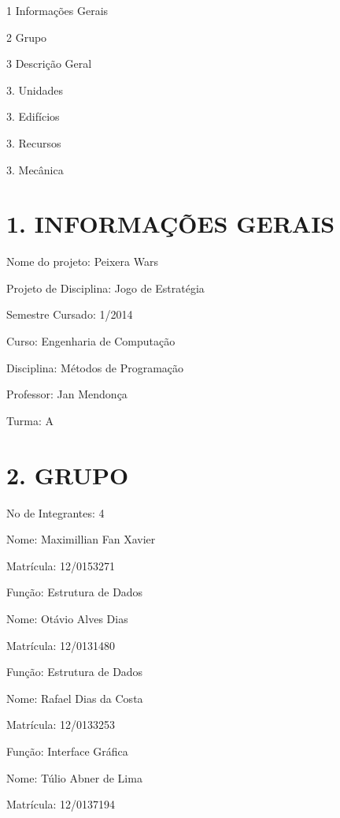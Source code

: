 1 \-Informações \-Gerais\par
 2 \-Grupo\par
 3 \-Descrição \-Geral\par
 3. \-Unidades\par
 3. \-Edifícios\par
 3. \-Recursos\par
 3. \-Mecânica\par
\par
\par
 \hypertarget{index_geral}{}\section{1. I\-N\-F\-O\-R\-M\-AÇÕ\-E\-S G\-E\-R\-A\-I\-S}\label{index_geral}
\-Nome do projeto\-: \-Peixera \-Wars\par
 \-Projeto de \-Disciplina\-: \-Jogo de \-Estratégia\par
 \-Semestre \-Cursado\-: 1/2014\par
 \-Curso\-: \-Engenharia de \-Computação\par
 \-Disciplina\-: \-Métodos de \-Programação\par
 \-Professor\-: \-Jan \-Mendonça\par
 \-Turma\-: \-A\par
\par
\par
 \hypertarget{index_grupo}{}\section{2. G\-R\-U\-P\-O}\label{index_grupo}
\-No de \-Integrantes\-: 4\par
 \-Nome\-: \-Maximillian \-Fan \-Xavier\par
 \-Matrícula\-: 12/0153271\par
 \-Função\-: \-Estrutura de \-Dados\par
 \-Nome\-: \-Otávio \-Alves \-Dias\par
 \-Matrícula\-: 12/0131480\par
 \-Função\-: \-Estrutura de \-Dados\par
 \-Nome\-: \-Rafael \-Dias da \-Costa\par
 \-Matrícula\-: 12/0133253\par
 \-Função\-: \-Interface \-Gráfica\par
 \-Nome\-: \-Túlio \-Abner de \-Lima\par
 \-Matrícula\-: 12/0137194\par
